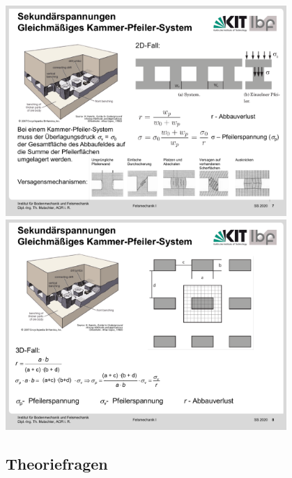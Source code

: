 \documentclass[fleqn,twoside]{article}
\begin{document}
\begin{minipage}{.47\textwidth}
    \includegraphics[width=0.8\textwidth]{Grafiken/Abbauverlust.pdf}
    \includegraphics[width=0.8\textwidth]{Grafiken/Abbauverlust3d.pdf}
\end{minipage}



\subsection{Theoriefragen}
\end{document}
